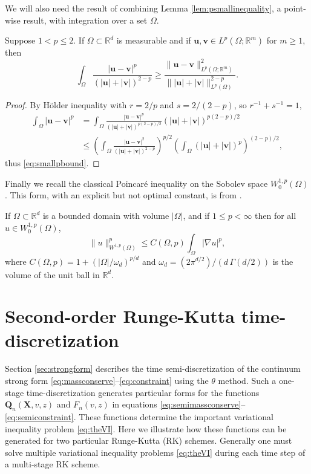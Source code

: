 \documentclass[final,leqno,onefignum,onetabnum]{siamltex1213bueler}
\newcommand\bu{\mathbf{u}}
\newcommand\bv{\mathbf{v}}
\newcommand\bQ{\mathbf{Q}}
\newcommand\bX{\mathbf{X}}
\renewcommand{\grad}{\nabla}
\newcommand\RR{\mathbb{R}}
\begin{document}
We will also need the result of combining Lemma \ref{lem:psmallinequality}, a point-wise result, with integration over a set $\Omega$.

\begin{lemma} \label{lem:smallpbound}  Suppose $1<p\le 2$.  If $\Omega \subset \RR^d$ is measurable and if $\bu,\bv\in L^p(\Omega; \RR^m)$ for $m\ge 1$, then
\begin{equation}
    \int_\Omega \frac{|\bu-\bv|^p}{\left(|\bu|+|\bv|\right)^{2-p}} \ge \frac{\|\bu-\bv\|_{L^p(\Omega; \RR^m)}^2}{\big\||\bu|+|\bv|\big\|_{L^p(\Omega)}^{2-p}}. \label{eq:smallpbound}
\end{equation}
\end{lemma}

\begin{proof}  By H\"older inequality with $r=2/p$ and $s=2/(2-p)$, so $r^{-1}+s^{-1}=1$,
\begin{align*}
\int_\Omega |\bu - \bv|^p &= \int_\Omega \frac{|\bu-\bv|^p}{\left(|\bu|+|\bv|\right)^{p(2-p)/2}} \left(|\bu|+|\bv|\right)^{p(2-p)/2} \\
    &\le \left(\int_\Omega \frac{|\bu-\bv|^2}{\left(|\bu|+|\bv|\right)^{2-p}}\right)^{p/2} \left(\int_\Omega \left(|\bu|+|\bv|\right)^p\right)^{(2-p)/2},
\end{align*}
thus \eqref{eq:smallpbound}.
\end{proof}

Finally we recall the classical Poincar\'e inequality on the Sobolev space $W_0^{1,p}(\Omega)$.  This form, with an explicit but not optimal constant, is from \cite[section 7.8]{GilbargTrudinger2001}.

\begin{lemma} \label{lem:poincare}  If $\Omega\subset \RR^d$ is a bounded domain with volume $|\Omega|$, and if $1\le p<\infty$ then for all $u\in W_0^{1,p}(\Omega)$,
\begin{equation}
  \|u\|_{W^{1,p}(\Omega)}^p \le C(\Omega,p) \int_\Omega |\grad u|^p, \label{eq:poincare}
\end{equation}
where $C(\Omega,p)=1+(|\Omega|/\omega_d)^{p/d}$ and $\omega_d=(2 \pi^{d/2})/(d\,\Gamma(d/2))$ is the volume of the unit ball in $\RR^d$.
\end{lemma}


\section{Second-order Runge-Kutta time-discretization}  \label{app:rk2}  Section \ref{sec:strongform} describes the time semi-discretization of the continuum strong form \eqref{eq:massconserve}--\eqref{eq:constraint} using the $\theta$ method.  Such a one-stage time-discretization generates particular forms for the functions $\bQ_n(\bX,v,z)$ and $F_n(v,z)$ in equations \eqref{eq:semimassconserve}--\eqref{eq:semiconstraint}.  These functions determine the important variational inequality problem \eqref{eq:theVI}.  Here we illustrate how these functions can be generated for two particular Runge-Kutta (RK) schemes.  Generally one must solve multiple variational inequality problems \eqref{eq:theVI} during each time step of a multi-stage RK scheme.
\end{document}
